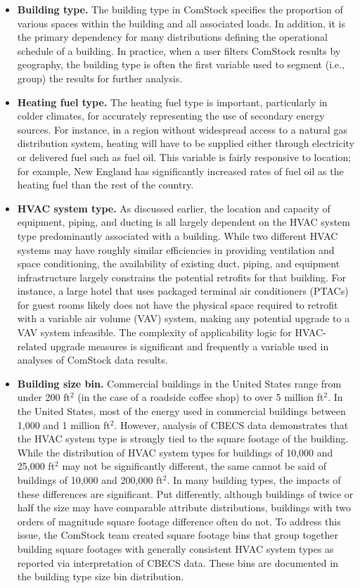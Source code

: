 \begin{itemize}
  \item \textbf{Building type.} The building type in ComStock specifies the proportion of various spaces within the building and all associated loads. In addition, it is the primary dependency for many distributions defining the operational schedule of a building. In practice, when a user filters ComStock results by geography, the building type is often the first variable used to segment (i.e., group) the results for further analysis.
  \item \textbf{Heating fuel type.} The heating fuel type is important, particularly in colder climates, for accurately representing the use of secondary energy sources. For instance, in a region without widespread access to a natural gas distribution system, heating will have to be supplied either through electricity or delivered fuel such as fuel oil. This variable is fairly responsive to location; for example, New England has significantly increased rates of fuel oil as the heating fuel than the rest of the country.
  \item \textbf{HVAC system type.} As discussed earlier, the location and capacity of equipment, piping, and ducting is all largely dependent on the HVAC system type predominantly associated with a building. While two different HVAC systems may have roughly similar efficiencies in providing ventilation and space conditioning, the availability of existing duct, piping, and equipment infrastructure largely constrains the potential retrofits for that building. For instance, a large hotel that uses packaged terminal air conditioners (PTACs) for guest rooms likely does not have the physical space required to retrofit with a variable air volume (VAV) system, making any potential upgrade to a VAV system infeasible. The complexity of applicability logic for HVAC-related upgrade measures is significant and frequently a variable used in analyses of ComStock data results.
  \item \textbf{Building size bin.} Commercial buildings in the United States range from under 200 ft$^2$ (in the case of a roadside coffee shop) to over 5 million ft$^2$. In the United States, most of the energy used in commercial buildings between 1,000 and 1 million ft$^2$. However, analysis of CBECS data demonstrates that the HVAC system type is strongly tied to the square footage of the building. While the distribution of HVAC system types for buildings of 10,000 and 25,000 ft$^2$ may not be significantly different, the same cannot be said of buildings of 10,000 and 200,000 ft$^2$. In many building types, the impacts of these differences are significant. Put differently, although buildings of twice or half the size may have comparable attribute distributions, buildings with two orders of magnitude square footage difference often do not. To address this issue, the ComStock team created square footage bins that group together building square footages with generally consistent HVAC system types as reported via interpretation of CBECS data. These bins are documented in the building type size bin distribution.

\end{itemize}
